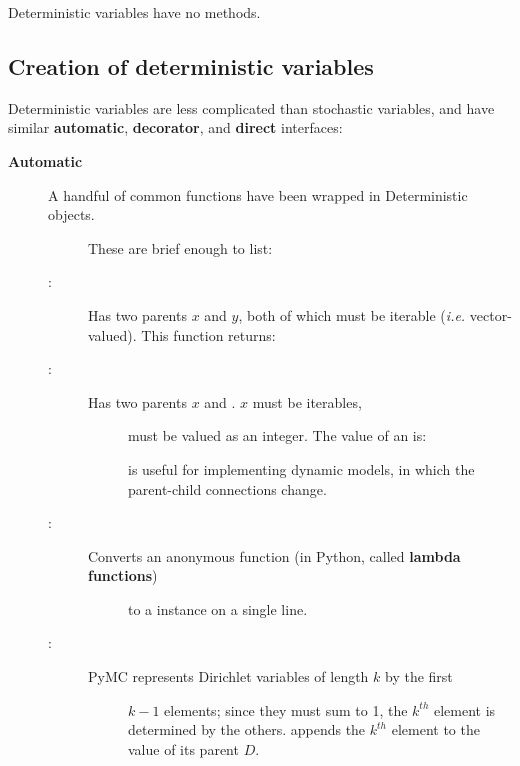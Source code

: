 \documentclass[letterpaper,10pt,english]{sphinxmanual}
\begin{document}
Deterministic variables have no methods.


\subsection{Creation of deterministic variables}
\label{modelbuilding:creation-of-deterministic-variables}
Deterministic variables are less complicated than stochastic variables, and have similar \textbf{automatic}, \textbf{decorator}, and \textbf{direct} interfaces:
\begin{description}
\item[{\textbf{Automatic}}] \leavevmode\begin{description}
\item[{A handful of common functions have been wrapped in Deterministic objects.}] \leavevmode
These are brief enough to list:

\item[{:}] \leavevmode
Has two parents $x$ and $y$, both of which must be iterable (\emph{i.e.}
vector-valued). This function returns:

\item[{:}] \leavevmode\begin{description}
\item[{Has two parents $x$ and . $x$ must be iterables,}] \leavevmode
{} must be valued as an integer. The value of an  is:

 is useful for implementing dynamic models, in which the
parent-child connections change.

\end{description}

\item[{:}] \leavevmode\begin{description}
\item[{Converts an anonymous function (in Python, called \textbf{lambda functions})}] \leavevmode
to a  instance on a single line.

\end{description}

\item[{:}] \leavevmode\begin{description}
\item[{PyMC represents Dirichlet variables of length $k$ by the first}] \leavevmode
$k-1$ elements; since they must sum to 1, the $k^{th}$
element is determined by the others.  appends the
$k^{th}$ element to the value of its parent $D$.


\end{description}
\end{description}
\end{description}
\end{document}
